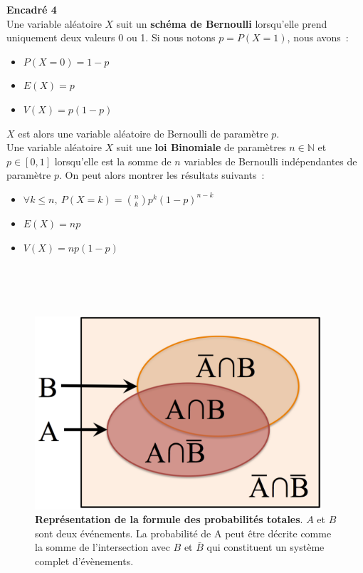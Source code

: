 \setlength{\columnsep}{1cm}
 \begin{minipage}{0.9\linewidth}
 \textbf{Encadré 4} \\
Une variable aléatoire $X$ suit un \textbf{schéma de Bernoulli} lorsqu'elle prend uniquement deux valeurs 0 ou 1. Si nous notons $p=P(X=1)$, nous avons~:
\begin{itemize}
\item $P(X=0)=1-p$
\item $E(X)=p$
\item $V(X)=p(1-p)$
\end{itemize}
$X$ est alors une variable aléatoire de Bernoulli de paramètre $p$. \\
Une variable aléatoire $X$ suit une \textbf{loi Binomiale} de paramètres $n\in\mathbb{N}$ et $p\in[0,1]$ lorsqu'elle est la somme de $n$ variables de Bernoulli indépendantes de paramètre $p$. On peut alors montrer les résultats suivants~:
\begin{itemize}
\item $\forall k \leq n,~ P(X=k)=\binom{n}{k}p^k(1-p)^{n-k}$
\item $E(X)=np$
\item $V(X)=np(1-p)$
\end{itemize}
 \end{minipage}
\\  \\  \\


\begin{figure}[h!]
\centering
\includegraphics[width=0.95\textwidth]{annexe1/fig/figAnnI3.pdf}
\caption[Représentation de la formule des probabilités totales.]{\textbf{Représentation de la formule des probabilités totales}. $A$ et $B$ sont deux événements. La probabilité de A peut être décrite comme la somme de l'intersection avec $B$ et $\bar B$ qui constituent un système complet d'évènements.}
\label{dess1}
\end{figure}

